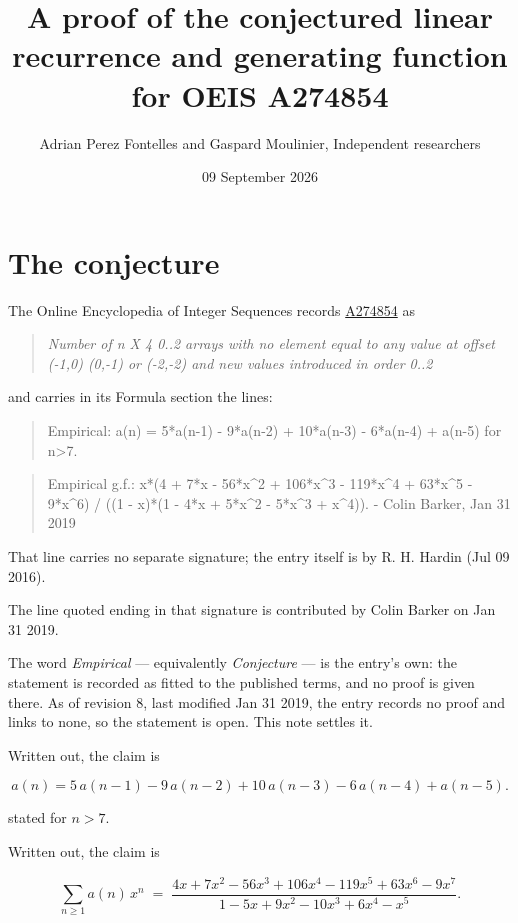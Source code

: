 \documentclass[11pt]{article}
\title{A proof of the conjectured linear recurrence and generating function for OEIS A274854}
\author{Adrian Perez Fontelles and Gaspard Moulinier, Independent researchers}
\date{09 September 2026}
\theoremstyle{definition}
\begin{document}
\maketitle
\section{The conjecture}

The Online Encyclopedia of Integer Sequences records \href{https://oeis.org/A274854}{A274854} as

\begin{quote}\itshape Number of n X 4 0..2 arrays with no element equal to any value at offset (-1,0) (0,-1) or (-2,-2) and new values introduced in order 0..2\end{quote}

and carries in its Formula section the lines:

\begin{quote}\ttfamily Empirical: a(n) = 5*a(n-1) - 9*a(n-2) + 10*a(n-3) - 6*a(n-4) + a(n-5) for n>7.\end{quote}

\begin{quote}\ttfamily Empirical g.f.: x*(4 + 7*x - 56*x\textasciicircum{}2 + 106*x\textasciicircum{}3 - 119*x\textasciicircum{}4 + 63*x\textasciicircum{}5 - 9*x\textasciicircum{}6) / ((1 - x)*(1 - 4*x + 5*x\textasciicircum{}2 - 5*x\textasciicircum{}3 + x\textasciicircum{}4)). - Colin Barker, Jan 31 2019\end{quote}

That line carries no separate signature; the entry itself is by R. H. Hardin (Jul 09 2016).

The line quoted ending in that signature is contributed by Colin Barker on Jan 31 2019.

The word {\itshape Empirical} --- equivalently {\itshape Conjecture} --- is the entry's own: the statement is recorded as fitted to the published terms, and no proof is given there. As of revision 8, last modified Jan 31 2019, the entry records no proof and links to none, so the statement is open. This note settles it.

Written out, the claim is

\[a(n) = 5\,a(n-1) - 9\,a(n-2) + 10\,a(n-3) - 6\,a(n-4) + a(n-5).\]

stated for $n > 7$.

Written out, the claim is

\[\sum_{n \ge 1} a(n)\,x^n \;=\; \frac{4x + 7x^{2} - 56x^{3} + 106x^{4} - 119x^{5} + 63x^{6} - 9x^{7}}{1 - 5x + 9x^{2} - 10x^{3} + 6x^{4} - x^{5}}.\]
\end{document}

